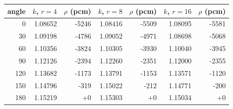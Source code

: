 \begin{tabular}{rrrrrrr}
\hline
angle & $k$, $r=4$ & $\rho$ (pcm) & $k$, $r=8$ & $\rho$ (pcm) & $k$, $r=16$ & $\rho$ (pcm)\\
\hline
0 & 1.08652 & -5246 & 1.08416 & -5509 & 1.08095 & -5581\\
30 & 1.09198 & -4786 & 1.09052 & -4971 & 1.08698 & -5068\\
60 & 1.10356 & -3824 & 1.10305 & -3930 & 1.10040 & -3945\\
90 & 1.12126 & -2394 & 1.12260 & -2351 & 1.12000 & -2355\\
120 & 1.13682 & -1173 & 1.13791 & -1153 & 1.13571 & -1120\\
150 & 1.14796 & -319 & 1.15022 & -212 & 1.14771 & -200\\
180 & 1.15219 & +0 & 1.15303 & +0 & 1.15034 & +0\\
\hline
\end{tabular}
